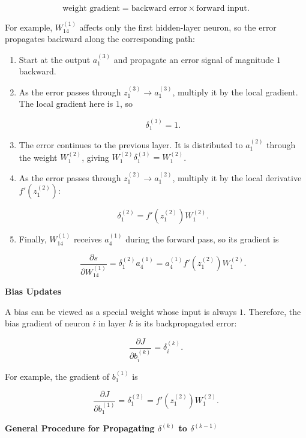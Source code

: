 \documentclass[
  a4paper,
  10pt]{article}
\begin{document}
\[
\text{weight gradient}
=\text{backward error}\times\text{forward input}.
\]

For example, \(W_{14}^{(1)}\) affects only the first hidden-layer
neuron, so the error propagates backward along the corresponding path:

\begin{enumerate}
\def\labelenumi{\arabic{enumi}.}
\item
  Start at the output \(a_1^{(3)}\) and propagate an error signal of
  magnitude \(1\) backward.
\item
  As the error passes through \(z_1^{(3)}\to a_1^{(3)}\), multiply it by
  the local gradient. The local gradient here is \(1\), so

  \[
  \delta_1^{(3)}=1.
  \]
\item
  The error continues to the previous layer. It is distributed to
  \(a_1^{(2)}\) through the weight \(W_1^{(2)}\), giving
  \(W_1^{(2)}\delta_1^{(3)}=W_1^{(2)}\).
\item
  As the error passes through \(z_1^{(2)}\to a_1^{(2)}\), multiply it by
  the local derivative \(f'\left(z_1^{(2)}\right)\):

  \[
  \delta_1^{(2)}
  =f'\left(z_1^{(2)}\right)W_1^{(2)}.
  \]
\item
  Finally, \(W_{14}^{(1)}\) receives \(a_4^{(1)}\) during the forward
  pass, so its gradient is

  \[
  \frac{\partial s}{\partial W_{14}^{(1)}}
  =\delta_1^{(2)}a_4^{(1)}
  =a_4^{(1)}f'\left(z_1^{(2)}\right)W_1^{(2)}.
  \]
\end{enumerate}

\textbf{Bias Updates}

A bias can be viewed as a special weight whose input is always \(1\).
Therefore, the bias gradient of neuron \(i\) in layer \(k\) is its
backpropagated error:

\[
\frac{\partial J}{\partial b_i^{(k)}}
=\delta_i^{(k)}.
\]

For example, the gradient of \(b_1^{(1)}\) is

\[
\frac{\partial J}{\partial b_1^{(1)}}
=\delta_1^{(2)}
=f'\left(z_1^{(2)}\right)W_1^{(2)}.
\]

\textbf{General Procedure for Propagating \(\delta^{(k)}\) to
\(\delta^{(k-1)}\)}
\end{document}
